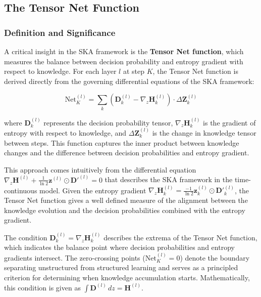 \documentclass{article}
\begin{document}
\FloatBarrier	
	\subsection{The Tensor Net Function}
	
	\subsubsection{Definition and Significance}
	
	A critical insight in the SKA framework is the \textbf{Tensor Net function}, which measures the balance between decision probability and entropy gradient with respect to knowledge. For each layer $l$ at step $K$, the Tensor Net function is derived directly from the governing differential equations of the SKA framework:
	
	\begin{equation}
		\text{Net}^{(l)}_K = \sum_k  (\mathbf{D}^{(l)}_k - \nabla_z \mathbf{H}^{(l)}_k) \cdot \Delta \mathbf{Z}^{(l)}_k 
	\end{equation}
	
	where $\mathbf{D}^{(l)}_k$ represents the decision probability tensor, $\nabla_z \mathbf{H}^{(l)}_k$ is the gradient of entropy with respect to knowledge, and $\Delta \mathbf{Z}^{(l)}_k$ is the change in knowledge tensor between steps. This function captures the inner product between knowledge changes and the difference between decision probabilities and entropy gradient.  

This approach comes intuitively from the differential equation $\nabla_z \mathbf{H}^{(l)} + \frac{1}{\ln 2}\mathbf{z}^{(l)} \odot \mathbf{D'}^{(l)} = 0$ that describes the SKA framework in the time-continuous model. Given the entropy gradient $\nabla_z \mathbf{H}^{(l)}_k = \frac{-1}{\ln 2}\mathbf{z}^{(l)}_k \odot \mathbf{D'}^{(l)}_k$, the Tensor Net function gives a well defined measure of the alignment between the knowledge evolution and the decision probabilities combined with the entropy gradient.

The condition \(\mathbf{D}^{(l)}_k = \nabla_z \mathbf{H}^{(l)}_k\) describes the extrema of the Tensor Net function, which indicates the balance point where decision probabilities and entropy gradients intersect. The zero-crossing points (\( \text{Net}^{(l)}_K = 0\)) denote the boundary separating unstructured from structured learning and serves as a principled criterion for determining when knowledge accumulation starts. Mathematically, this condition is given as $\int \mathbf{D}^{(l)} \, dz = \mathbf{H}^{(l)}$. 
\end{document}
